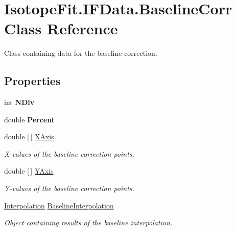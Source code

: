 \hypertarget{class_isotope_fit_1_1_i_f_data_1_1_baseline_corr}{}\section{Isotope\+Fit.\+I\+F\+Data.\+Baseline\+Corr Class Reference}
\label{class_isotope_fit_1_1_i_f_data_1_1_baseline_corr}


Class containing data for the baseline correction.  


\subsection*{Properties}
\begin{DoxyCompactItemize}
\item 
\mbox{\label{class_isotope_fit_1_1_i_f_data_1_1_baseline_corr_aff8b37286e9eeb3239af723553e27f7f}} 
int {\bfseries N\+Div}
\item 
\mbox{\label{class_isotope_fit_1_1_i_f_data_1_1_baseline_corr_a352473c9b2afa678f8595d0e1a9389fa}} 
double {\bfseries Percent}
\item 
\mbox{\label{class_isotope_fit_1_1_i_f_data_1_1_baseline_corr_a90e35ea8c62d07f0279f4b5f7d440491}} 
double \mbox{[}$\,$\mbox{]} \hyperlink{class_isotope_fit_1_1_i_f_data_1_1_baseline_corr_a90e35ea8c62d07f0279f4b5f7d440491}{X\+Axis}
\begin{DoxyCompactList}\small\item\em X-\/values of the baseline correction points. \end{DoxyCompactList}\item 
double \mbox{[}$\,$\mbox{]} \hyperlink{class_isotope_fit_1_1_i_f_data_1_1_baseline_corr_aa71067f79827da27836daa705413133c}{Y\+Axis}
\begin{DoxyCompactList}\small\item\em Y-\/values of the baseline correction points. \end{DoxyCompactList}\item 
\hyperlink{class_isotope_fit_1_1_interpolation}{Interpolation} \hyperlink{class_isotope_fit_1_1_i_f_data_1_1_baseline_corr_a914a7b2ac945482a7c73874fbff45951}{Baseline\+Interpolation}
\begin{DoxyCompactList}\small\item\em Object containing results of the baseline interpolation. \end{DoxyCompactList}\end{DoxyCompactItemize}


